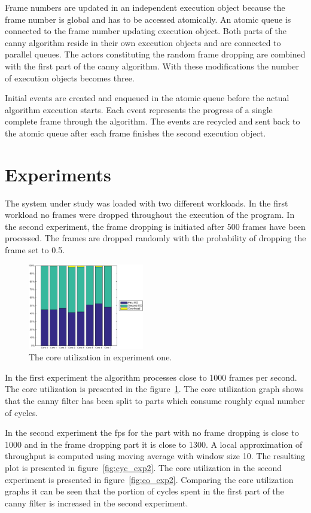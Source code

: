 \documentclass[a4paper,10pt]{article}
\begin{document}
Frame numbers are updated in an independent execution object because the frame number is global and has to be accessed atomically. An atomic queue is connected to the frame number updating execution object. Both parts of the canny algorithm reside in their own execution objects and are connected to parallel queues. The actors constituting the random frame dropping are combined with the first part of the canny algorithm. With these modifications the number of execution objects becomes three.

Initial events are created and enqueued in the atomic queue before the actual algorithm execution starts. Each event represents the progress of a single complete frame through the algorithm. The events are recycled and sent back to the atomic queue after each frame finishes the second execution object.

\section{Experiments}
The system under study was loaded with two different workloads. In the first workload no frames were dropped throughout the execution of the program. In the second experiment, the frame dropping is initiated after 500 frames have been processed. The frames are dropped randomly with the probability of dropping the frame set to 0.5.

\begin{figure}
    \centering
        \includegraphics[width=0.45\textwidth]{exp1_eo.eps}
        \caption{The core utilization in experiment one.}
        \label{fig:eo_exp1}
\end{figure}

In the first experiment the algorithm processes close to 1000 frames per second. The core utilization is presented in the figure~\ref{fig:eo_exp1}. The core utilization graph shows that the canny filter has been split to parts which consume roughly equal number of cycles.

In the second experiment the fps for the part with no frame dropping is close to 1000 and in the frame dropping part it is close to 1300. A local approximation of throughput is computed using moving average with window size 10. The resulting plot is presented in figure~\ref{fig:cyc_exp2}. The core utilization in the second experiment is presented in figure~\ref{fig:eo_exp2}. Comparing the core utilization graphs it can be seen that the portion of cycles spent in the first part of the canny filter is increased in the second experiment.
\end{document}
